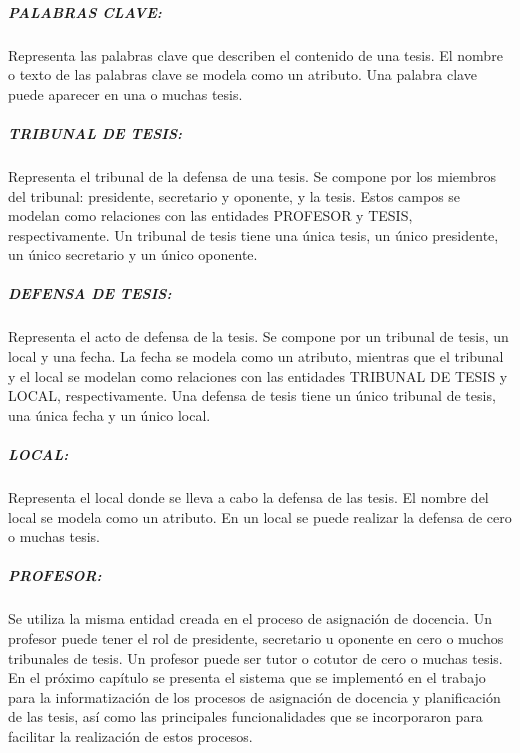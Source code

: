 \subparagraph{PALABRAS CLAVE:}
Representa las palabras clave que describen el contenido de una tesis.
El nombre o texto de las palabras clave se modela como un atributo. Una 
palabra clave puede aparecer en una o muchas tesis. 


\subparagraph{TRIBUNAL DE TESIS:}
Representa el tribunal de la defensa de una tesis.
Se compone por los miembros del tribunal: presidente, secretario y oponente, 
y la tesis.
Estos campos se modelan como relaciones con las entidades PROFESOR y TESIS, respectivamente.
Un tribunal de tesis tiene una única tesis, un único presidente, un único secretario y 
un único oponente.


\subparagraph{DEFENSA DE TESIS:}
Representa el acto de defensa de la tesis. 
Se compone por un tribunal de tesis, un local y una 
fecha. La fecha se modela como un atributo, mientras que 
el tribunal y el local se modelan como relaciones con las entidades TRIBUNAL DE 
TESIS y LOCAL, respectivamente. Una defensa de tesis tiene un único tribunal de tesis,
una única fecha y un único local.



\subparagraph{LOCAL:}
Representa el local donde se lleva a cabo la defensa de las tesis.
El nombre del local se modela como un atributo. 
En un local se puede realizar la defensa de cero o muchas tesis.


\subparagraph{PROFESOR:}
Se utiliza la misma entidad creada en el proceso de asignación de docencia.
Un profesor puede tener el rol de presidente, secretario u oponente en cero o 
muchos tribunales de tesis. Un profesor puede ser 
tutor o cotutor de cero o muchas tesis. \\




En el próximo capítulo se presenta el sistema que se implementó en el 
trabajo para la informatización de los procesos de asignación de docencia
y planificación de las tesis, así como las principales funcionalidades que se 
incorporaron para facilitar la realización de estos procesos.

